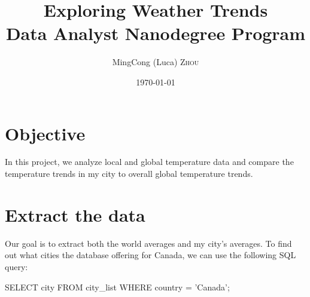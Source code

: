 \documentclass{article}
\title{Exploring Weather Trends \\ Data Analyst Nanodegree Program} %
\author{MingCong (Luca) \textsc{Zhou}} %
\date{\today} %
\begin{document}
\maketitle %



\section{Objective}
In this project, we analyze local and global temperature data and compare the temperature trends in my city to overall global temperature trends.

 

\section{Extract the data}
Our goal is to extract both the world averages and my city’s averages. To find out what cities the database offering for Canada, we can use the following SQL query:
\begin{center} SELECT city FROM city\_list WHERE country = 'Canada'; \end{center}
\end{document}
